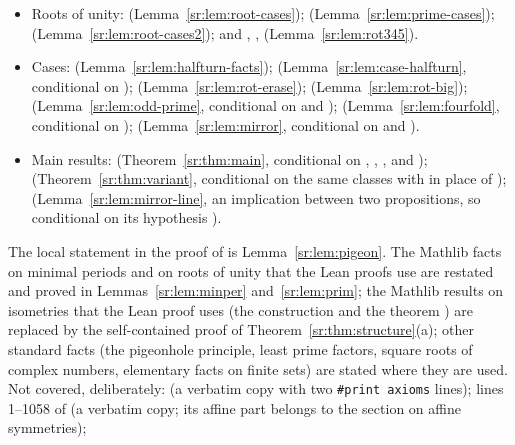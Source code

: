 \begin{itemize}
  supporting lines'' in the foundations section; the short proof is repeated here.
\item Roots of unity:  (Lemma~\ref{sr:lem:root-cases}); 
  (Lemma~\ref{sr:lem:prime-cases});  (Lemma~\ref{sr:lem:root-cases2}); and
  , ,  (Lemma~\ref{sr:lem:rot345}).
\item Cases:  (Lemma~\ref{sr:lem:halfturn-facts}); 
  (Lemma~\ref{sr:lem:case-halfturn}, conditional on ); 
  (Lemma~\ref{sr:lem:rot-erase});  (Lemma~\ref{sr:lem:rot-big}); 
  (Lemma~\ref{sr:lem:odd-prime}, conditional on  and ); 
  (Lemma~\ref{sr:lem:fourfold}, conditional on );  (Lemma~\ref{sr:lem:mirror},
  conditional on  and ).
\item Main results:  (Theorem~\ref{sr:thm:main}, conditional on
  , , ,  and );
   (Theorem~\ref{sr:thm:variant}, conditional on the same classes with
   in place of );
   (Lemma~\ref{sr:lem:mirror-line}, an implication between two propositions,
  so conditional on its hypothesis ).
\end{itemize}
The local statement  in the proof of  is Lemma~\ref{sr:lem:pigeon}. The Mathlib
facts on minimal periods and on roots of unity that the Lean proofs use are restated and proved in
Lemmas~\ref{sr:lem:minper} and~\ref{sr:lem:prim}; the Mathlib results on isometries that the Lean proof uses (the
construction  and the theorem ) are
replaced by the self-contained proof of Theorem~\ref{sr:thm:structure}(a); other standard facts (the pigeonhole
principle, least prime factors, square roots of complex numbers, elementary facts on finite sets) are stated where they
are used. Not covered,
deliberately:
 (a verbatim copy with two \texttt{\#print axioms} lines); lines 1--1058 of
 (a verbatim copy; its affine part belongs to the section on affine symmetries);
